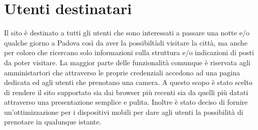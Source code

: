 \section{Utenti destinatari}
Il sito è destinato a tutti gli utenti che sono interessati a passare una notte e/o qualche giorno a Padova così da aver la possibiltàdi visitare la città,
ma anche per coloro che ricercano solo informazioni sulla struttura e/o indicazioni di posti da poter visitare.
La maggior parte delle funzionalità comunque è riservata agli amministartori che attraverso le proprie credenziali accedono ad una pagina dedicata ed agli utenti che prenotano una camera.
A questo scopo è stato scelto di rendere il sito supportato sia dai browser più recenti sia da quelli più datati attraverso una presentazione semplice e pulita.
Inoltre è stato deciso di fornire un'ottimizzazione per i dispositivi mobili per dare agli utenti la possibilità di prenotare in qualunque istante.
